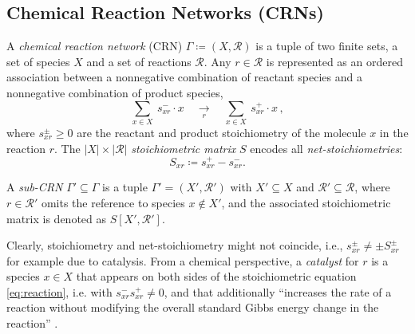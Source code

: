 \documentclass[pdflatex]{sn-jnl}
\theoremstyle{thmstyleone}%
\theoremstyle{examplesty}%
\theoremstyle{thmstylethree}%
\newcommand{\SM}{S}
\newcommand{\CR}[0]{\mathcal{R}}
\begin{document}
\subsection{Chemical Reaction Networks (CRNs)}
\label{sect:term}
A \emph{chemical reaction network} (CRN) $\Gamma \coloneqq (X,\CR)$ is a
tuple of two finite sets, a set of species $X$ and a set of reactions
$\CR$.  Any $r \in \CR$ is represented as an ordered association between a
nonnegative combination of reactant species and a nonnegative combination of
product species,
\begin{equation}\label{eq:reaction}
  \sum_{x\in X}\ s^-_{xr} \cdot x \quad
  \underset{r}{\longrightarrow} \quad
  \sum_{x\in X} \ s^+_{xr}\cdot x\,,
\end{equation}
where $s^{\pm}_{xr}\ge0$ are the reactant and product stoichiometry of the
molecule $x$ in the reaction $r$. The $|X|\times|\CR|$ \emph{stoichiometric
  matrix} $\SM$ encodes all \emph{net-stoichiometries}:
\begin{equation} 
  \SM_{xr} \coloneqq s^+_{xr}-s^-_{xr}.
\end{equation}

A \emph{sub-CRN} $\Gamma'\subseteq \Gamma$ is a tuple $\Gamma'=(X',\CR')$
with $X'\subseteq X$ and $\CR'\subseteq \CR$, where $r\in \CR'$ omits the
reference to species $x\not\in X'$, and the associated stoichiometric
matrix is denoted as $S[X',\mathcal{R}']$.

Clearly, stoichiometry and net-stoichiometry might not coincide, i.e.,
$s^{\pm}_{xr}\neq \pm S^{\pm}_{xr}$ for example due to
catalysis. From a chemical perspective, a \emph{catalyst} for $r$ is a
species $x\in X$ that appears on both sides of the stoichiometric equation
\eqref{eq:reaction}, i.e. with $s^-_{xr}s^+_{xr}\neq 0$, and that
additionally ``increases the rate of a reaction without modifying the
overall standard Gibbs energy change in the reaction''
\cite{gold_iupac_2025}.
\end{document}
